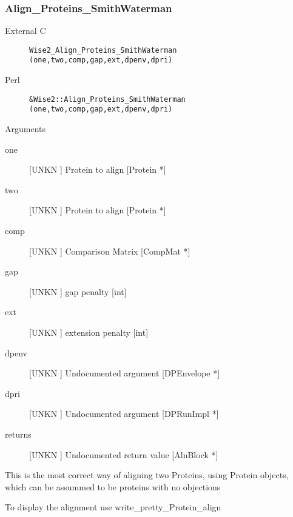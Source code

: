\subsubsection{Align_Proteins_SmithWaterman}
\begin{description}
\item[External C] {\tt Wise2_Align_Proteins_SmithWaterman (one,two,comp,gap,ext,dpenv,dpri)}
\item[Perl] {\tt &Wise2::Align_Proteins_SmithWaterman (one,two,comp,gap,ext,dpenv,dpri)}

\end{description}
Arguments
\begin{description}
\item[one] [UNKN ] Protein to align [Protein *]
\item[two] [UNKN ] Protein to align [Protein *]
\item[comp] [UNKN ] Comparison Matrix [CompMat *]
\item[gap] [UNKN ] gap penalty [int]
\item[ext] [UNKN ] extension penalty [int]
\item[dpenv] [UNKN ] Undocumented argument [DPEnvelope *]
\item[dpri] [UNKN ] Undocumented argument [DPRunImpl *]
\item[returns] [UNKN ] Undocumented return value [AlnBlock *]
\end{description}
This is the most correct way of aligning two Proteins,
using Protein objects, which can be assummed to be
proteins with no objections


To display the alignment use write_pretty_Protein_align




